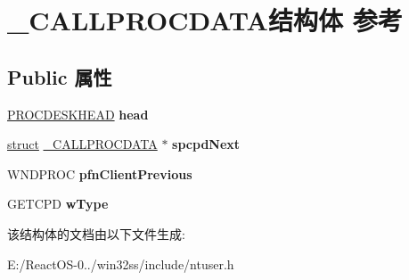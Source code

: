 \hypertarget{struct___c_a_l_l_p_r_o_c_d_a_t_a}{}\section{\+\_\+\+C\+A\+L\+L\+P\+R\+O\+C\+D\+A\+T\+A结构体 参考}
\label{struct___c_a_l_l_p_r_o_c_d_a_t_a}
\subsection*{Public 属性}
\begin{DoxyCompactItemize}
\item 
\mbox{\label{struct___c_a_l_l_p_r_o_c_d_a_t_a_a6eef5712c2b6ca38fe83f69b574ad89b}} 
\hyperlink{struct___p_r_o_c_d_e_s_k_h_e_a_d}{P\+R\+O\+C\+D\+E\+S\+K\+H\+E\+AD} {\bfseries head}
\item 
\mbox{\label{struct___c_a_l_l_p_r_o_c_d_a_t_a_ac032ac84f147e6f38cdeed3308edbffe}} 
\hyperlink{interfacestruct}{struct} \hyperlink{struct___c_a_l_l_p_r_o_c_d_a_t_a}{\+\_\+\+C\+A\+L\+L\+P\+R\+O\+C\+D\+A\+TA} $\ast$ {\bfseries spcpd\+Next}
\item 
\mbox{\label{struct___c_a_l_l_p_r_o_c_d_a_t_a_a88dd4a028165ea26bccc91e7db435996}} 
W\+N\+D\+P\+R\+OC {\bfseries pfn\+Client\+Previous}
\item 
\mbox{\label{struct___c_a_l_l_p_r_o_c_d_a_t_a_a20329556503e0d5e331e62cdcc443e3f}} 
G\+E\+T\+C\+PD {\bfseries w\+Type}
\end{DoxyCompactItemize}


该结构体的文档由以下文件生成\+:\begin{DoxyCompactItemize}
\item 
E\+:/\+React\+O\+S-\/0../win32ss/include/ntuser.\+h\end{DoxyCompactItemize}
